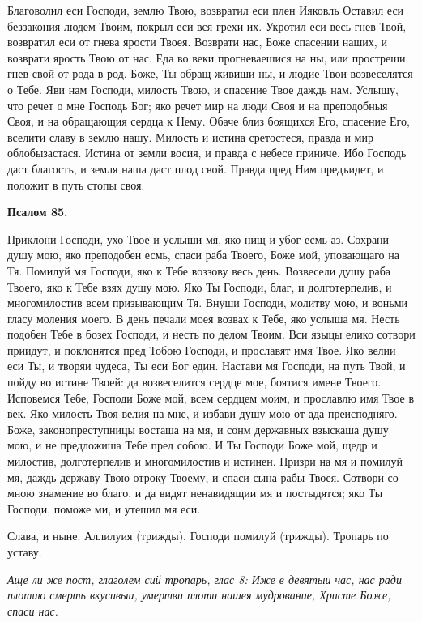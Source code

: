 Благоволил еси Господи, землю Твою, возвратил еси плен Ияковль Оставил еси беззакония людем Твоим, покрыл еси вся грехи их. Укротил еси весь гнев Твой, возвратил еси от гнева ярости Твоея. Возврати нас, Боже спасении наших, и возврати ярость Твою от нас. Еда во веки прогневаешися на ны, или простреши гнев свой от рода в род. Боже, Ты обращ живиши ны, и людие Твои возвеселятся о Тебе. Яви нам Господи, милость Твою, и спасение Твое даждь нам. Услышу, что речет о мне Господь Бог; яко речет мир на люди Своя и на преподобныя Своя, и на обращающия сердца к Нему. Обаче близ боящихся Его, спасение Его, вселити славу в землю нашу. Милость и истина сретостеся, правда и мир облобызастася. Истина от земли восия, и правда с небесе приниче. Ибо Господь даст благость, и земля наша даст плод свой. Правда пред Ним предъидет, и положит в путь стопы своя.


\medskip


\bfseries Псалом 85.\normalfont{}


Приклони Господи, ухо Твое и услыши мя, яко нищ и убог есмь аз. Сохрани душу мою, яко преподобен есмь, спаси раба Твоего, Боже мой, уповающаго на Тя. Помилуй мя Господи, яко к Тебе воззову весь день. Возвесели душу раба Твоего, яко к Тебе взях душу мою. Яко Ты Господи, благ, и долготерпелив, и многомилостив всем призывающим Тя. Внуши Господи, молитву мою, и воньми гласу моления моего. В день печали моея возвах к Тебе, яко услыша мя. Несть подобен Тебе в бозех Господи, и несть по делом Твоим. Вси языцы елико сотвори приидут, и поклонятся пред Тобою Господи, и прославят имя Твое. Яко велии еси Ты, и творяи чудеса, Ты еси Бог един. Настави мя Господи, на путь Твой, и пойду во истине Твоей: да возвеселится сердце мое, боятися имене Твоего. Исповемся Тебе, Господи Боже мой, всем сердцем моим, и прославлю имя Твое в век. Яко милость Твоя велия на мне, и избави душу мою от ада преисподняго. Боже, законопреступницы восташа на мя, и сонм державных взыскаша душу мою, и не предложиша Тебе пред собою. И Ты Господи Боже мой, щедр и милостив, долготерпелив и многомилостив и истинен. Призри на мя и помилуй мя, даждь державу Твою отроку Твоему, и спаси сына рабы Твоея. Сотвори со мною знамение во благо, и да видят ненавидящии мя и постыдятся; яко Ты Господи, поможе ми, и утешил мя еси.

Слава, и ныне. Аллилуия (трижды). Господи помилуй (трижды). Тропарь по уставу.


\itshape Аще ли же пост, глаголем сий тропарь, глас 8:\normalfont{} Иже в девятыи час, нас ради плотию смерть вкусивыи, умертви плоти нашея мудрование, Христе Боже, спаси нас.


